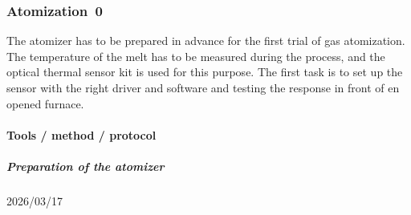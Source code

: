 \documentclass[../../main.tex]{subfiles}
\begin{document}
\subsubsection{Atomization~0}

The atomizer has to be prepared in advance for the first trial of gas atomization. The temperature of the melt has to be measured during the process, and the optical thermal sensor kit is used for this purpose. The first task is to set up the sensor with the right driver and software and testing the response in front of en opened furnace.

\paragraph{Tools / method / protocol}
\label{}

\subparagraph{Preparation of the atomizer}
\label{}

2026/03/17
\end{document}

